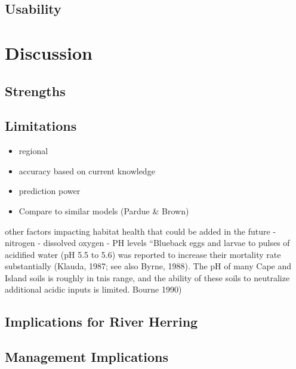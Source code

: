 \documentclass[
]{book}
\begin{document}
\hypertarget{usability}{%
\section{Usability}\label{usability}}

\hypertarget{discussion}{%
\chapter{Discussion}\label{discussion}}

\hypertarget{strengths}{%
\section{Strengths}\label{strengths}}

\hypertarget{limitations}{%
\section{Limitations}\label{limitations}}

\begin{itemize}
\item
  regional
\item
  accuracy based on current knowledge
\item
  prediction power
\item
  Compare to similar models (Pardue \& Brown)
\end{itemize}

other factors impacting habitat health that could be added in the future
- nitrogen
- dissolved oxygen
- PH levels
``Blueback eggs and larvae to pulses of acidified water
(pH 5.5 to 5.6) was reported to increase their
mortality rate substantially (Klauda, 1987; see also
Byrne, 1988). The pH of many Cape and Island soils is
roughly in tnis range, and the ability of these soils
to neutralize additional acidic inputs is limited. Bourne 1990)

\hypertarget{implications-for-river-herring}{%
\section{Implications for River Herring}\label{implications-for-river-herring}}

\hypertarget{management-implications}{%
\section{Management Implications}\label{management-implications}}
\end{document}
